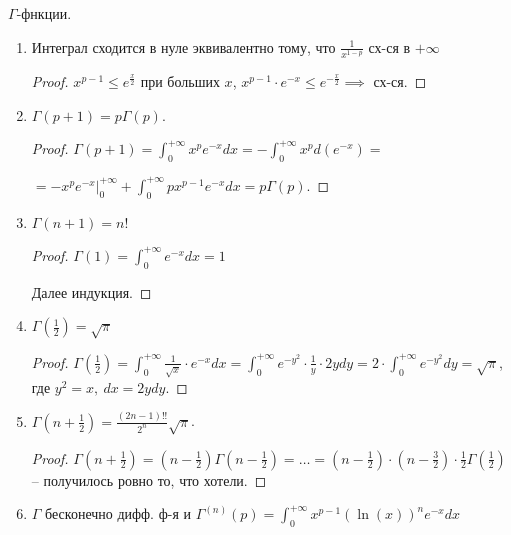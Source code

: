 \begin{properties}
    $\Gamma$-фнкции.

    \begin{enumerate}
        \item {
            Интеграл сходится в нуле эквивалентно тому, что $\frac{1}{x^{1-p}}$ сх-ся в $+\infty$
            
            \begin{proof}
                $x^{p-1} \leq e^{\frac{x}{2}}$ при больших $x$, $x^{p-1} \cdot e^{-x} \leq e^{-\frac{x}{2}} \implies$ сх-ся.
            \end{proof}
        }
        \item {
            $\Gamma(p+1) = p \Gamma(p)$.

            \begin{proof}
                $\Gamma(p+1) = \int_{0}^{+\infty} { x^p e^{-x} dx } = - \int_{0}^{+\infty} { x^p d (e^{-x}) } =$
                
                $= -x^p e^{-x} |_{0}^{+\infty} + \int_{0}^{+\infty} { p x^{p-1} e^{-x} dx } = p \Gamma(p)$.
            \end{proof}
        }
        \item {
            $\Gamma(n+1) = n!$
            
            \begin{proof}
                $\Gamma(1) = \int_{0}^{+\infty} { e^{-x} dx } = 1$

                Далее индукция.
            \end{proof}
        }
        \item {
            $\Gamma(\frac{1}{2}) = \sqrt{\pi}$

            \begin{proof}
                $\Gamma(\frac{1}{2}) = \int_{0}^{+\infty} { \frac{1}{\sqrt{x}} \cdot e^{-x} dx } = \int_{0}^{+\infty} { e^{-y^2} \cdot \frac{1}{y} \cdot 2y d y } = 2 \cdot \int_{0}^{+\infty} { e^{-y^2} dy } = \sqrt{\pi}$, где $y^2 = x, \ dx = 2y dy$.
            \end{proof}
        }
        \item {
            $\Gamma(n + \frac{1}{2}) = \frac{(2n - 1)!!}{2^n} \sqrt{\pi}$.

            \begin{proof}
                $\Gamma(n + \frac{1}{2}) = (n - \frac{1}{2}) \Gamma (n - \frac{1}{2}) = \dots = (n - \frac{1}{2}) \cdot (n - \frac{3}{2}) \cdot \frac{1}{2} \Gamma(\frac{1}{2})$ -- получилось ровно то, что хотели.
            \end{proof}
        }
        \item {
            $\Gamma$ бесконечно дифф. ф-я и $\Gamma^{(n)}(p) = \int_{0}^{+\infty} { x^{p-1} \left( \ln(x) \right)^n e^{-x} dx }$
            
}
\end{enumerate}
\end{properties}
